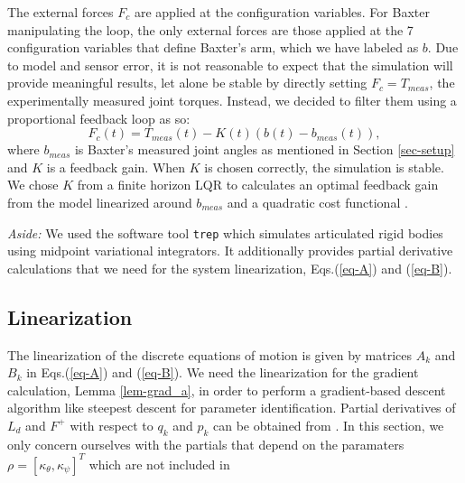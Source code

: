 \documentclass[letterpaper, 10pt, conference]{ieeeconf}
\begin{document}
The external forces $F_c$ are applied at the configuration variables.  For Baxter manipulating the loop, the only external forces are those applied at the 7 configuration variables that define Baxter's arm, which we have labeled as $b$. Due to model and sensor error, it is not reasonable to expect that the simulation will provide meaningful results, let alone be stable by directly setting $F_c = T_{meas}$, the experimentally measured joint torques.  Instead, we decided to filter them using a proportional feedback loop as so:
\[
F_{c}(t) = T_{meas}(t) - K(t) (b(t) - b_{meas}(t)),
\]
where $b_{meas}$ is Baxter's measured joint angles as mentioned in Section \ref{sec-setup} and $K$ is a feedback gain.  When $K$ is chosen correctly, the simulation is stable.  We chose $K$ from a finite horizon LQR to calculates an optimal feedback gain from the model linearized around $b_{meas}$ and a quadratic cost functional \cite{anderson_moore}.

\emph{Aside:}  We used the software tool \texttt{trep} \cite{johnson_murphey_scalable} which simulates articulated rigid bodies using midpoint variational integrators.  It additionally provides partial derivative calculations that we need for the system linearization, Eqs.(\ref{eq-A}) and (\ref{eq-B}).  

\subsection{Linearization}
The linearization of the discrete equations of motion is given by matrices $A_k$ and $B_k$ in Eqs.(\ref{eq-A}) and (\ref{eq-B}).  We need the linearization for the gradient calculation, Lemma \ref{lem-grad_a}, in order to perform a gradient-based descent algorithm like steepest descent for parameter identification.  Partial derivatives of $L_d$ and $F^+$ with respect to $q_k$ and $p_k$ can be obtained from \cite{johnson_murphey_linearization}.  In this section, we only concern ourselves with the partials that depend on the paramaters $\rho = [\kappa_\theta,\kappa_\psi]^T$ which are not included in \cite{johnson_murphey_linearization}
\end{document}
